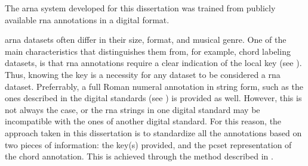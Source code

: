 

The \gls{arna} system developed for this dissertation was
trained from publicly available \gls{rna} annotations in a
digital format. 

\gls{arna} datasets often  differ in their size, format, and
musical genre. One of the main characteristics that
distinguishes them from, for example, chord labeling
datasets, is that \gls{rna} annotations require a clear
indication of the local key (see ).
Thus, knowing the key is a necessity for any dataset to be
considered a \gls{rna} dataset. Preferrably, a full Roman
numeral annotation in string form, such as the ones
described in the digital standards (see
) is provided as well.
However, this is not always the case, or the \gls{rna}
strings in one digital standard may be incompatible with the
ones of another digital standard. For this reason, the
approach taken in this dissertation is to standardize all
the annotations based on two pieces of information: the
key(s) provided, and the \gls{pcset} representation of the
chord annotation. This is achieved through the method
described in
.
